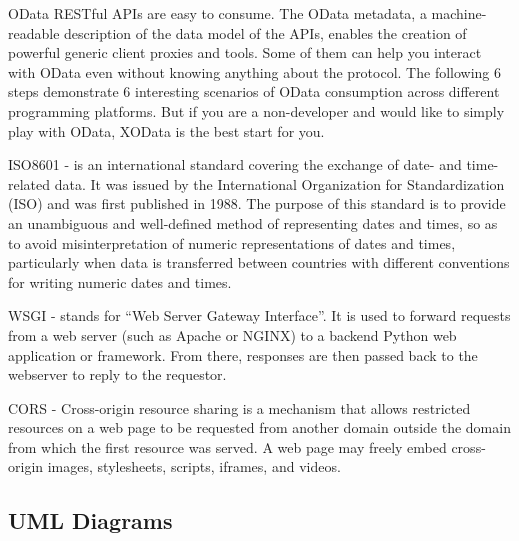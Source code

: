 OData RESTful APIs are easy to consume. The OData metadata, a machine-readable description of the data model of the APIs, enables the creation of powerful generic client proxies and tools. Some of them can help you interact with OData even without knowing anything about the protocol. The following 6 steps demonstrate 6 interesting scenarios of OData consumption across different programming platforms. But if you are a non-developer and would like to simply play with OData, XOData is the best start for you. 

ISO8601 - is an international standard covering the exchange of date- and time-related data. It was issued by the International Organization for Standardization (ISO) and was first published in 1988. The purpose of this standard is to provide an unambiguous and well-defined method of representing dates and times, so as to avoid misinterpretation of numeric representations of dates and times, particularly when data is transferred between countries with different conventions for writing numeric dates and times. 

WSGI - stands for “Web Server Gateway Interface”. It is used to forward requests from a web server (such as Apache or NGINX) to a backend Python web application or framework. From there, responses are then passed back to the webserver to reply to the requestor. 

CORS - Cross-origin resource sharing is a mechanism that allows restricted resources on a web page to be requested from another domain outside the domain from which the first resource was served. A web page may freely embed cross-origin images, stylesheets, scripts, iframes, and videos. 

\subsection{UML Diagrams}
